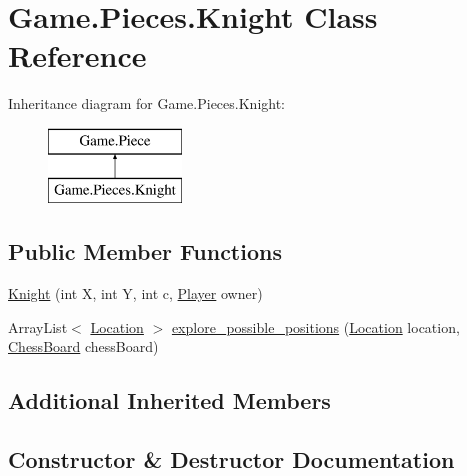 \hypertarget{class_game_1_1_pieces_1_1_knight}{}\section{Game.\+Pieces.\+Knight Class Reference}
\label{class_game_1_1_pieces_1_1_knight}
Inheritance diagram for Game.\+Pieces.\+Knight\+:\begin{figure}[H]
\begin{center}
\leavevmode
\includegraphics[height=2.000000cm]{class_game_1_1_pieces_1_1_knight}
\end{center}
\end{figure}
\subsection*{Public Member Functions}
\begin{DoxyCompactItemize}
\item 
\hyperlink{class_game_1_1_pieces_1_1_knight_af679624407663583c0f269ecd94ab4f9}{Knight} (int X, int Y, int c, \hyperlink{class_game_1_1_player}{Player} owner)
\item 
Array\+List$<$ \hyperlink{class_game_1_1_location}{Location} $>$ \hyperlink{class_game_1_1_pieces_1_1_knight_a0572a6b367275995dc4d9f8687595544}{explore\+\_\+possible\+\_\+positions} (\hyperlink{class_game_1_1_location}{Location} location, \hyperlink{class_game_1_1_chess_board}{Chess\+Board} chess\+Board)
\end{DoxyCompactItemize}
\subsection*{Additional Inherited Members}


\subsection{Constructor \& Destructor Documentation}
\mbox{\label{class_game_1_1_pieces_1_1_knight_af679624407663583c0f269ecd94ab4f9}} 
